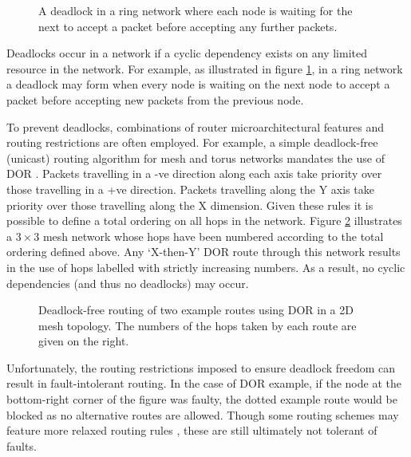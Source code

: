 			\begin{figure}
				\center
				
				\caption{A deadlock in a ring network where each node is waiting for
				the next to accept a packet before accepting any further packets.}
				\label{fig:ring-deadlock}
			\end{figure}
			
			Deadlocks occur in a network if a cyclic dependency exists on any limited
			resource in the network. For example, as illustrated in figure
			\ref{fig:ring-deadlock}, in a ring network a deadlock may form when every
			node is waiting on the next node to accept a packet before accepting new
			packets from the previous node.
			
			To prevent deadlocks, combinations of router microarchitectural features
			and routing restrictions are often employed. For example, a simple
			deadlock-free (unicast) routing algorithm for mesh and torus networks
			mandates the use of DOR \cite{dally93}. Packets travelling in a -ve
			direction along each axis take priority over those travelling in a +ve
			direction. Packets travelling along the Y axis take priority over those
			travelling along the X dimension. Given these rules it is possible to
			define a total ordering on all hops in the network. Figure
			\ref{fig:deadlock-free-dor} illustrates a $3\times3$ mesh network whose
			hops have been numbered according to the total ordering defined above.
			Any `X-then-Y' DOR route through this network results in the use of hops
			labelled with strictly increasing numbers. As a result, no cyclic
			dependencies (and thus no deadlocks) may occur.
			
			\begin{figure}
				\center
			
				\caption{Deadlock-free routing of two example routes using DOR in a 2D
				mesh topology. The numbers of the hops taken by each route are given on
				the right.}
				\label{fig:deadlock-free-dor}
			\end{figure}
			
			Unfortunately, the routing restrictions imposed to ensure deadlock
			freedom can result in fault-intolerant routing. In the case of DOR
			example, if the node at the bottom-right corner of the figure was faulty,
			the dotted example route would be blocked as no alternative routes are
			allowed. Though some routing schemes may feature more relaxed routing
			rules \cite{rodrigo09}, these are still ultimately not tolerant of
			faults.
			
